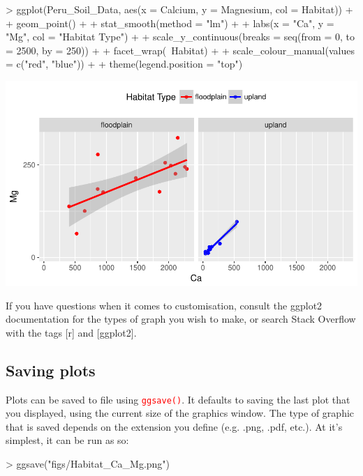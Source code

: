 \documentclass[a4paper,12pt]{article}
\newcommand\code[1]{\textcolor{red}{\texttt{#1}}}
\begin{document}
\begin{shaded}
\begin{Schunk}
\begin{Sinput}
> ggplot(Peru_Soil_Data, aes(x = Calcium, y = Magnesium, col = Habitat)) +
+   geom_point() +
+   stat_smooth(method = "lm") +
+   labs(x = "Ca", y = "Mg", col = "Habitat Type") +
+   scale_y_continuous(breaks = seq(from = 0, to = 2500, by = 250)) +
+   facet_wrap(~Habitat) +
+   scale_colour_manual(values = c("red", "blue")) +
+   theme(legend.position = "top")
\end{Sinput}
\end{Schunk}
\includegraphics{3_Course_Notes-knitr-025}
\end{shaded}




If you have questions when it comes to customisation, consult the ggplot2 documentation for the types of graph you wish to make, or search Stack Overflow with the tags [r] and [ggplot2].

\subsection{Saving plots}

Plots can be saved to file using \code{ggsave()}. It defaults to saving the last plot that you displayed, using the current size of the graphics window. The type of graphic that is saved depends on the extension you define (e.g. .png, .pdf, etc.). At it's simplest, it can be run as so:

\begin{shaded}
\begin{Schunk}
\begin{Sinput}
> ggsave("figs/Habitat_Ca_Mg.png")
\end{Sinput}
\end{Schunk}
\end{shaded}
\end{document}
